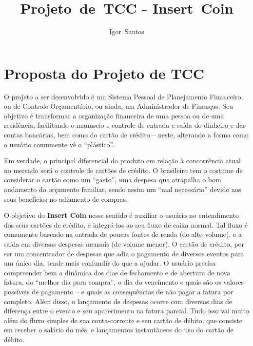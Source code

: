 \documentclass[a4paper]{abnt}
\author{Igor~Santos}
\title{Projeto~de~TCC - Insert~Coin}
\begin{document}
\maketitle


\tableofcontents

\chapter{Proposta do Projeto de TCC}

O projeto a ser desenvolvido é um Sistema Pessoal de Planejamento Financeiro, ou de Controle Orçamentário, ou ainda, um Administrador de
Finanças. Seu objetivo é transformar a organização financeira de uma pessoa ou de uma residência, facilitando o manuseio e controle de entrada e saída do dinheiro e das contas bancárias, bem como do cartão de crédito – neste, alterando a forma como o usuário comumente vê o ``plástico''.

Em verdade, o principal diferencial do produto em relação à concorrência atual no mercado será o controle de cartões de crédito. O brasileiro tem o costume de considerar o cartão como um ``gasto'', uma despesa que atrapalha o bom andamento do orçamento familiar, sendo assim um ``mal necessário'' devido aos seus benefícios no adiamento de compras.

O objetivo do \textbf{Insert Coin} nesse sentido é auxiliar o usuário no entendimento dos seus cartões de crédito, e integrá-los ao seu fluxo de caixa normal. Tal fluxo é comumente baseado na entrada de poucas fontes de renda (de alto volume), e a saída em diversas despesas mensais (de volume menor). O cartão de crédito, por ser um concentrador de despesas que adia o pagamento de diversos eventos para um único dia, tende mais confundir do que a ajudar. O usuário precisa compreender bem a dinâmica dos dias de fechamento e de abertura de nova fatura, do ``melhor dia para compra'', o dia do vencimento e quais são os valores possíveis de pagamento – e quais as consequências de não pagar a fatura por completo. Além disso, o lançamento de despesas ocorre com diversos dias de diferença entre o evento e seu aparecimento na fatura parcial. Tudo isso vai muito além do fluxo simples de sua conta-corrente e seu cartão de débito, que consiste em receber o salário do mês, e lançamentos instantâneos do uso do cartão de débito.

\end{document}
